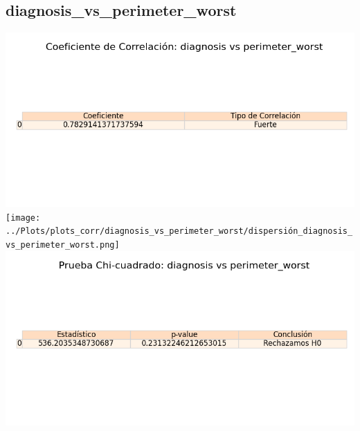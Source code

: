 \documentclass[a4paper, 12pt]{article}
\begin{document}
\subsection{diagnosis\_vs\_perimeter\_worst}
    \includegraphics[width = \textwidth]{../Plots/plots_corr/diagnosis_vs_perimeter_worst/coeficiente_correlacion_diagnosis_vs_perimeter_worst.png}
    \texttt{[image: ../Plots/plots\_corr/diagnosis\_vs\_perimeter\_worst/dispersión\_diagnosis\_vs\_perimeter\_worst.png]}
    \includegraphics[width = \textwidth]{../Plots/plots_corr/diagnosis_vs_perimeter_worst/chi_cuadrado_diagnosis_vs_perimeter_worst.png}
\end{document}
